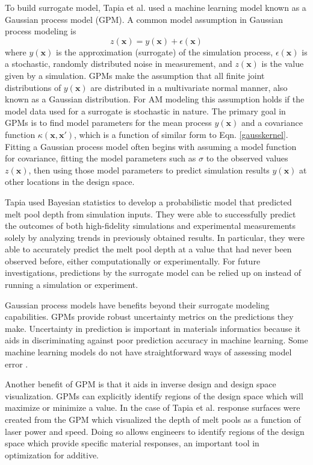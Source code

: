 To build surrogate model, Tapia et al. used a machine learning model known as a Gaussian process model (GPM). A common model assumption in Gaussian process modeling is
\begin{equation}
	z(\mathbf{x}) = y(\mathbf{x}) + \epsilon(\mathbf{x})
	\label{model}
\end{equation}
where $y(\mathbf{x})$ is the approximation (surrogate) of the simulation process, $\epsilon(\mathbf{x})$ is a stochastic, randomly distributed noise in measurement, and $z(\mathbf{x})$ is the value given by a simulation. GPMs make the assumption that all finite joint distributions of $y(\mathbf{x})$ are distributed in a multivariate normal manner, also known as a Gaussian distribution. For AM modeling this assumption holds if the model data used for a surrogate is stochastic in nature. The primary goal in GPMs is to find model parameters for the mean process $y(\mathbf{x})$ and a covariance function $\kappa(\mathbf{x},\mathbf{x}')$, which is a function of similar form to Eqn. \ref{gausskernel}. Fitting a Gaussian process model often begins with assuming a model function for covariance, fitting the model parameters such as $\sigma$ to the observed values $z(\mathbf{x})$, then using those model parameters to predict simulation results $y(\mathbf{x})$ at other locations in the design space. 

Tapia used Bayesian statistics to develop a probabilistic model that predicted melt pool depth from simulation inputs. They were able to successfully predict the outcomes of both high-fidelity simulations and experimental measurements solely by analyzing trends in previously obtained results. In particular, they were able to accurately predict the melt pool depth at a value that had never been observed before, either computationally or experimentally. For future investigations, predictions by the surrogate model can be relied up on instead of running a simulation or experiment. 

Gaussian process models have benefits beyond their surrogate modeling capabilities. GPMs provide robust uncertainty metrics on the predictions they make. Uncertainty in prediction is important in materials informatics because it aids in discriminating against poor prediction accuracy in machine learning. Some machine learning models do not have straightforward ways of assessing model error \cite{Bessa2017}. 

Another benefit of GPM is that it aids in inverse design and design space visualization. GPMs can explicitly identify regions of the design space which will maximize or minimize a value. In the case of Tapia et al. response surfaces were created from the GPM which visualized the depth of melt pools as a function of laser power and speed. Doing so allows engineers to identify regions of the design space which provide specific material responses, an important tool in optimization for additive.

